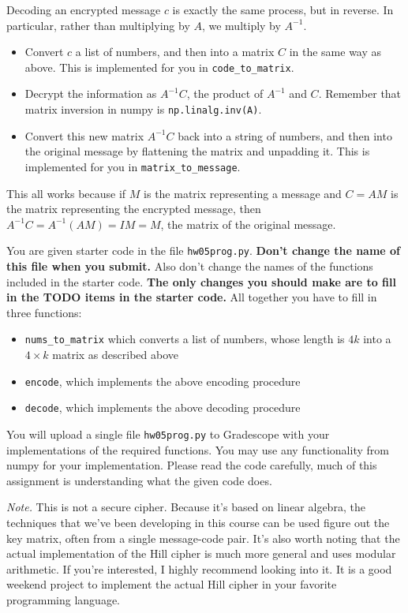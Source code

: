 \documentclass{article}
\theoremstyle{remark}
\begin{document}
Decoding an encrypted message $c$ is exactly the same process, but in reverse.
In particular, rather than multiplying by $A$, we multiply by $A^{-1}$.
\begin{itemize}
\item Convert $c$ a list of numbers, and then into a matrix $C$ in the same way as above.
  This is implemented for you in \texttt{code\_to\_matrix}.
\item Decrypt the information as $A^{-1}C$, the product of $A^{-1}$ and $C$.
  Remember that matrix inversion in numpy is \texttt{np.linalg.inv(A)}.
\item Convert this new matrix $A^{-1}C$ back into a string of numbers, and then into the original message by flattening the matrix and unpadding it.
  This is implemented for you in \texttt{matrix\_to\_message}.
\end{itemize}
This all works because if $M$ is the matrix representing a message and $C = AM$ is the matrix representing the encrypted message, then $A^{-1}C = A^{-1}(AM) = IM = M$, the matrix of the original message.

\bigskip

\noindent You are given starter code in the file \texttt{hw05prog.py}.
\textbf{Don't change the name of this file when you submit.}
Also don't change the names of the functions included in the starter code.
\textbf{The only changes you should make are to fill in the TODO items in the starter code.}
All together you have to fill in three functions:
\begin{itemize}
\item \texttt{nums\_to\_matrix} which converts a list of numbers, whose length is $4k$ into a $4 \times k$ matrix as described above
\item \texttt{encode}, which implements the above encoding procedure
\item \texttt{decode}, which implements the above decoding procedure
\end{itemize}
You will upload a single file \texttt{hw05prog.py} to Gradescope with your implementations of the required functions.
You may use any functionality from numpy for your implementation.
Please read the code carefully, much of this assignment is understanding what the given code does.

\bigskip

\noindent\textit{Note.}
This is not a secure cipher.
Because it's based on linear algebra, the techniques that we've been developing in this course can be used figure out the key matrix, often from a single message-code pair.
It's also worth noting that the actual implementation of the Hill cipher is much more general and uses modular arithmetic.
If you're interested, I highly recommend looking into it.
It is a good weekend project to implement the actual Hill cipher in your favorite programming language.
\end{document}
